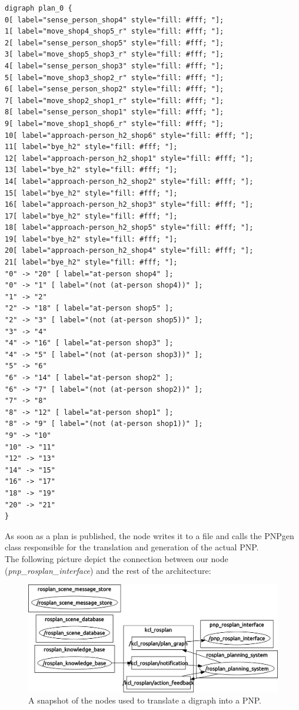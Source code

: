 \documentclass[pdftex,12pt,a4paper]{report}
\begin{document}
\begin{verbatim}
digraph plan_0 {
0[ label="sense_person_shop4" style="fill: #fff; "];
1[ label="move_shop4_shop5_r" style="fill: #fff; "];
2[ label="sense_person_shop5" style="fill: #fff; "];
3[ label="move_shop5_shop3_r" style="fill: #fff; "];
4[ label="sense_person_shop3" style="fill: #fff; "];
5[ label="move_shop3_shop2_r" style="fill: #fff; "];
6[ label="sense_person_shop2" style="fill: #fff; "];
7[ label="move_shop2_shop1_r" style="fill: #fff; "];
8[ label="sense_person_shop1" style="fill: #fff; "];
9[ label="move_shop1_shop6_r" style="fill: #fff; "];
10[ label="approach-person_h2_shop6" style="fill: #fff; "];
11[ label="bye_h2" style="fill: #fff; "];
12[ label="approach-person_h2_shop1" style="fill: #fff; "];
13[ label="bye_h2" style="fill: #fff; "];
14[ label="approach-person_h2_shop2" style="fill: #fff; "];
15[ label="bye_h2" style="fill: #fff; "];
16[ label="approach-person_h2_shop3" style="fill: #fff; "];
17[ label="bye_h2" style="fill: #fff; "];
18[ label="approach-person_h2_shop5" style="fill: #fff; "];
19[ label="bye_h2" style="fill: #fff; "];
20[ label="approach-person_h2_shop4" style="fill: #fff; "];
21[ label="bye_h2" style="fill: #fff; "];
"0" -> "20" [ label="at-person shop4" ];
"0" -> "1" [ label="(not (at-person shop4))" ];
"1" -> "2"
"2" -> "18" [ label="at-person shop5" ];
"2" -> "3" [ label="(not (at-person shop5))" ];
"3" -> "4"
"4" -> "16" [ label="at-person shop3" ];
"4" -> "5" [ label="(not (at-person shop3))" ];
"5" -> "6"
"6" -> "14" [ label="at-person shop2" ];
"6" -> "7" [ label="(not (at-person shop2))" ];
"7" -> "8"
"8" -> "12" [ label="at-person shop1" ];
"8" -> "9" [ label="(not (at-person shop1))" ];
"9" -> "10"
"10" -> "11"
"12" -> "13"
"14" -> "15"
"16" -> "17"
"18" -> "19"
"20" -> "21"
}
\end{verbatim}

\noindent As soon as a plan is published, the node writes it to a file and calls the PNPgen class responsible for the translation and generation of the actual PNP.\\ 
The following picture depict the connection between our node (\textit{pnp\_rosplan\_interface}) and the rest of the architecture:

\begin{figure}[htbp]
	\centering
	\includegraphics[scale=0.3]{images/rospnp.png}
	\caption{A snapshot of the nodes used to translate a digraph into a PNP.}
\end{figure}
\end{document}
